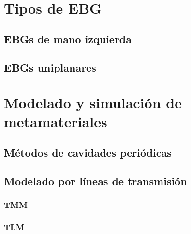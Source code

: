 \section{Tipos de EBG}
\label{sec_tipos_mtm}
\subsection{EBGs de mano izquierda}
\label{subsec_ebg_izquierda}
\subsection{EBGs uniplanares}
\label{subsec_ebg_uniplanar}
\section{Modelado y simulación de metamateriales}
\label{sec_simulacion_mtm}
\subsection{Métodos de cavidades periódicas}
\label{subsec_eigenfunctions}
\subsection{Modelado por líneas de transmisión}

\subsubsection{TMM}
\subsubsection{TLM}
\label{subsubsec_tlm}

